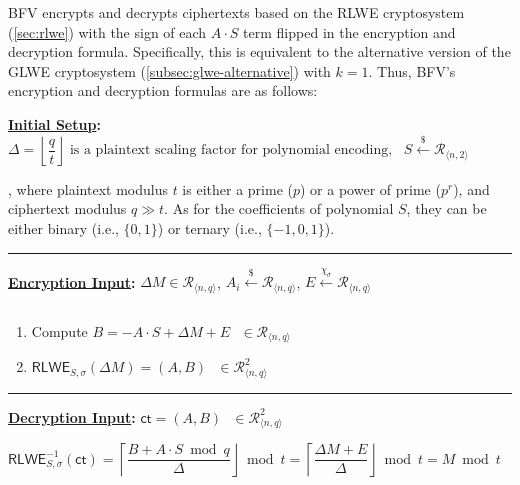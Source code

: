 BFV encrypts and decrypts ciphertexts based on the RLWE cryptosystem (\autoref{sec:rlwe}) with the sign of each $A\cdot S$ term flipped in the encryption and decryption formula. Specifically, this is equivalent to the alternative version of the GLWE cryptosystem (\autoref{subsec:glwe-alternative}) with $k = 1$. Thus, BFV's encryption and decryption formulas are as follows: 



\begin{tcolorbox}[title={\textbf{\tboxlabel{\ref*{subsec:bfv-enc-dec}} BFV Encryption and Decryption}}]

\textbf{\underline{Initial Setup}:} $\Delta=\left\lfloor\dfrac{q}{t}\right\rfloor \text{ is a plaintext scaling factor for polynomial encoding}, \text{ } S \xleftarrow{\$} \mathcal{R}_{\langle n, 2 \rangle}$

, where plaintext modulus $t$ is either a prime ($p$) or a power of prime ($p^r$), and ciphertext modulus $q \gg t$. As for the coefficients of polynomial $S$, they can be either binary (i.e., $\{0, 1\}$) or ternary (i.e., $\{-1, 0, 1\}$).

\par\noindent\rule{\textwidth}{0.4pt}

\textbf{\underline{Encryption Input}:} $\Delta M \in \mathcal{R}_{\langle n, q \rangle}$, $A_i \xleftarrow{\$} \mathcal{R}_{\langle n, q \rangle}$, $E \xleftarrow{\chi_\sigma} \mathcal{R}_{\langle n, q \rangle}$


$ $

\begin{enumerate}

\item Compute $B = -A \cdot S + \Delta M + E \text{ } \in \mathcal{R}_{\langle n,q \rangle}$

\item $\textsf{RLWE}_{S,\sigma}(\Delta M) = (A, B) \text{ } \in \mathcal{R}_{\langle n,q \rangle}^2$ 

\end{enumerate}

\par\noindent\rule{\textwidth}{0.4pt}

\textbf{\underline{Decryption Input}:} $\textsf{ct} = (A, B) \text{ } \in \mathcal{R}_{\langle n,q \rangle}^2$ 

$\textsf{RLWE}^{-1}_{S,\sigma}(\textsf{ct}) = \left\lceil\dfrac{B + A \cdot S \bmod q}{\Delta}\right\rfloor \bmod t = \left\lceil\dfrac{\Delta M + E}{\Delta}\right\rfloor \bmod t = M \bmod t$


\end{tcolorbox}
